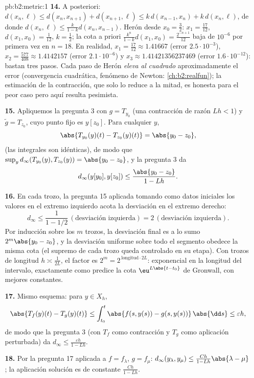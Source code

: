 \begin{solution}{pb:b2:metric:1}
\textbf{14.} A posteriori: $d(x_n, \ell) \leq d(x_n, x_{n+1}) +
d(x_{n+1}, \ell) \leq k\,d(x_{n-1}, x_n) + k\,d(x_n, \ell)$, de
donde $d(x_n, \ell) \leq \frac{k}{1-k}d(x_n, x_{n-1})$. Herón
desde $x_0 = \frac32$: $x_1 = \frac{17}{12}$, $d(x_1, x_0) =
\frac1{12}$, $k = \frac12$; la cota a priori
$\frac{k^n}{1-k}d(x_1,x_0) = \frac{2^{-n+1}}{12}$ baja de
$10^{-6}$ por primera vez en $n = 18$. En realidad, $x_1 =
\frac{17}{12} \approx 1.41667$ (error $2.5\cdot10^{-3}$), $x_2 =
\frac{577}{408} \approx 1.4142157$ (error $2.1\cdot10^{-6}$) y
$x_3 \approx 1.41421356237469$ (error $1.6\cdot10^{-12}$): bastan
tres pasos. Cada paso de Herón \emph{eleva al cuadrado}
aproximadamente el error (convergencia cuadrática, fenómeno de
Newton: \cref{ch:b2:realfun}); la estimación de la contracción,
que solo lo reduce a la mitad, es honesta para el peor caso pero
aquí resulta pesimista.

\textbf{15.} Apliquemos la pregunta 3 con $g = T_{y_0}$ (una
contracción de razón $Lh < 1$) y $\widetilde g = T_{z_0}$, cuyo
punto fijo es $y[z_0]$. Para cualquier $y$,
\[
\abs{T_{y_0}(y)(t) - T_{z_0}(y)(t)} = \abs{y_0 - z_0},
\]
(las integrales son idénticas), de modo que $\sup_y
d_\infty(T_{y_0}(y), T_{z_0}(y)) = \abs{y_0 - z_0}$, y la
pregunta 3 da
\[
d_\infty(y[y_0], y[z_0]) \leq \frac{\abs{y_0 - z_0}}{1 - Lh} .
\]

\textbf{16.} En cada trozo, la pregunta 15 aplicada tomando como
datos iniciales los valores en el extremo izquierdo acota la
desviación en el extremo derecho:
\[
d_\infty \leq \frac{1}{1 - 1/2}\,(\text{desviación izquierda})
= 2\,(\text{desviación izquierda}) .
\] Por
inducción sobre los $m$ trozos, la desviación final es a lo sumo
$2^m\abs{y_0 - z_0}$, y la desviación uniforme sobre todo el
segmento obedece la misma cota (el supremo de cada trozo queda
controlado en su etapa). Con trozos de longitud $h \asymp
\frac1{2L}$, el factor es $2^m = 2^{\,\text{longitud}\cdot 2L}$:
exponencial en la longitud del intervalo, exactamente como predice
la cota $\eu^{L\abs{t-t_0}}$ de Gronwall, con mejores constantes.

\textbf{17.} Mismo esquema: para $y \in X_h$,
\[
\abs{T_f(y)(t) - T_g(y)(t)} \leq \int_{t_0}^t \abs{f(s,y(s)) -
g(s,y(s))}\,\abs{\dd s} \leq \varepsilon h ,
\]
de modo que la pregunta 3 (con $T_f$ como contracción y $T_g$ como
aplicación perturbada) da $d_\infty \leq \frac{\varepsilon h}{1 -
Lh}$.

\textbf{18.} Por la pregunta 17 aplicada a $f = f_\lambda$, $g =
f_\mu$: $d_\infty(y_\lambda, y_\mu) \leq \frac{Ch}{1 -
Lh}\abs{\lambda - \mu}$; la aplicación solución es
 de constante $\frac{Ch}{1-Lh}$.


\end{solution}
